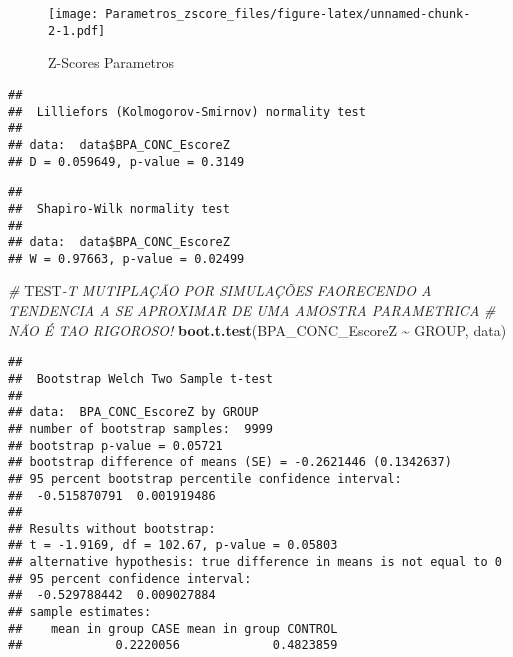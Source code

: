 \documentclass[
]{article}
\newenvironment{Shaded}{\begin{snugshade}}{\end{snugshade}}
\newcommand{\AlertTok}[1]{\textcolor[rgb]{0.94,0.16,0.16}{#1}}
\newcommand{\CommentTok}[1]{\textcolor[rgb]{0.56,0.35,0.01}{\textit{#1}}}
\newcommand{\FunctionTok}[1]{\textcolor[rgb]{0.13,0.29,0.53}{\textbf{#1}}}
\newcommand{\NormalTok}[1]{#1}
\newcommand{\SpecialCharTok}[1]{\textcolor[rgb]{0.81,0.36,0.00}{\textbf{#1}}}
\begin{document}
\begin{figure}
\centering
\texttt{[image: Parametros\_zscore\_files/figure-latex/unnamed-chunk-2-1.pdf]}
\caption{Z-Scores Parametros}
\end{figure}

\begin{Shaded}
\end{Shaded}

\begin{verbatim}
## 
##  Lilliefors (Kolmogorov-Smirnov) normality test
## 
## data:  data$BPA_CONC_EscoreZ
## D = 0.059649, p-value = 0.3149
\end{verbatim}

\begin{Shaded}
\end{Shaded}

\begin{verbatim}
## 
##  Shapiro-Wilk normality test
## 
## data:  data$BPA_CONC_EscoreZ
## W = 0.97663, p-value = 0.02499
\end{verbatim}

\begin{Shaded}
\begin{Highlighting}[]
      \CommentTok{\#     }\AlertTok{TEST}\CommentTok{{-}T MUTIPLAÇÃO POR SIMULAÇÕES  FAORECENDO A TENDENCIA A SE APROXIMAR DE UMA AMOSTRA PARAMETRICA}
          \CommentTok{\#   NÃO É TAO RIGOROSO!}
\FunctionTok{boot.t.test}\NormalTok{(BPA\_CONC\_EscoreZ }\SpecialCharTok{\textasciitilde{}}\NormalTok{ GROUP, data)}
\end{Highlighting}
\end{Shaded}

\begin{verbatim}
## 
##  Bootstrap Welch Two Sample t-test
## 
## data:  BPA_CONC_EscoreZ by GROUP
## number of bootstrap samples:  9999
## bootstrap p-value = 0.05721 
## bootstrap difference of means (SE) = -0.2621446 (0.1342637) 
## 95 percent bootstrap percentile confidence interval:
##  -0.515870791  0.001919486
## 
## Results without bootstrap:
## t = -1.9169, df = 102.67, p-value = 0.05803
## alternative hypothesis: true difference in means is not equal to 0
## 95 percent confidence interval:
##  -0.529788442  0.009027884
## sample estimates:
##    mean in group CASE mean in group CONTROL 
##             0.2220056             0.4823859
\end{verbatim}
\end{document}
